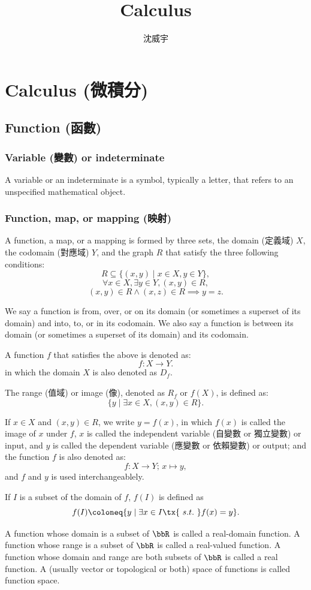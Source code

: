 \documentclass[a4paper,12pt]{report}
\begin{document}
\title{Calculus}
\author{沈威宇}
\date{\temtoday}
\titletocdoc
\chapter{Calculus (微積分)}
\section{Function (函數)}
\subsection{Variable (變數) or indeterminate}
A variable or an indeterminate is a symbol, typically a letter, that refers to an unspecified mathematical object.
\subsection{Function, map, or mapping (映射)}
A function, a map, or a mapping is formed by three sets, the domain (定義域) $X$, the codomain (對應域) $Y$, and the graph $R$ that satisfy the three following conditions:
\[R\subseteq \{(x,y)\mid x\in X,y\in Y\},\]
\[\forall x\in X,\exists y\in Y,\left(x,y\right)\in R ,\]
\[ (x,y)\in R\land (x,z)\in R\implies y=z.\]

We say a function is from, over, or on its domain (or sometimes a superset of its domain) and into, to, or in its codomain. We also say a function is between its domain (or sometimes a superset of its domain) and its codomain.

A function $f$ that satisfies the above is denoted as:
\[f\colon X\to Y.\]
in which the domain $X$ is also denoted as $D_f$.

The range (值域) or image (像), denoted as $R_f$ or $f(X)$, is defined as:
\[\{ y \mid \exists x \in X, (x, y) \in R \}.\]

If $x\in X$ and $(x, y) \in R$, we write $y = f(x)$, in which $f(x)$ is called the image of $x$ under $f$, $x$ is called the independent variable (自變數 or 獨立變數) or input, and $y$ is called the dependent variable (應變數 or 依賴變數) or output; and the function $f$ is also denoted as:
\[f \colon X \to Y;\, x \mapsto y,\]
and $f$ and $y$ is used interchangeablely.

If $I$ is a subset of the domain of $f$, $f(I)$ is defined as
\[f(I)\coloneq\{y\mid\exists x\in I \tx{\ s.t.\ }f(x)=y\}.\]

A function whose domain is a subset of $\bbR$ is called a real-domain function. A function whose range is a subset of $\bbR$ is called a real-valued function. A function whose domain and range are both subsets of $\bbR$ is called a real function.
A (usually vector or topological or both) space of functions is called function space.
\end{document}
